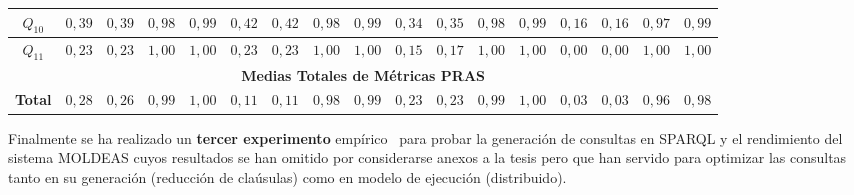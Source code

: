 \documentclass[a4paper,final,11pt,fleqn,twoside]{book}  %
\begin{document}
\begin{sidewaystable}[!t]
\begin{tabular}{|c||c|c|c|c||c|c|c|c||c|c|c|c||c|c|c|c|}
$Q_{10}$  &$0,39$ & $0,39$ & $0,98$ & $0,99$ & 		$0,42$ & $0,42$ & $0,98$ & $0,99$ & 	$0,34$ & $0,35$ & $0,98$ & $0,99$ & 	$0,16$ & $0,16$ & $0,97$ & $0,99$ \\ \hline
$Q_{11}$  &$0,23$ & $0,23$ & $1,00$ & $1,00$ & 		$0,23$ & $0,23$ & $1,00$ & $1,00$ & 	$0,15$ & $0,17$ & $1,00$ & $1,00$ & 	$0,00$ & $0,00$ & $1,00$ & $1,00$ \\ \hline
\multicolumn{17}{|c|}{\textbf{Medias Totales de Métricas PRAS}} \\ \hline
\textbf{Total}  &$0,28$ & $0,26$ & $0,99$ & $1,00$ & 	$0,11$ & $0,11$ & $0,98$ & $0,99$ & 	$0,23$ & $0,23$ & $0,99$ & $1,00$ & 	$0,03$ & $0,03$ & $0,96$ & $0,98$ \\ \hline
\hline
 \end{tabular}

 \end{sidewaystable} 
  
Finalmente se ha realizado un \textbf{tercer experimento} empírico~\cite{Alvarez:2011:QEM:2075561.2075618} para probar la generación de consultas en SPARQL y el rendimiento 
del sistema MOLDEAS cuyos resultados se han omitido por considerarse anexos a la tesis pero que han servido para optimizar las consultas tanto 
en su generación (reducción de claúsulas) como en modelo de ejecución (distribuido).
\end{document}
